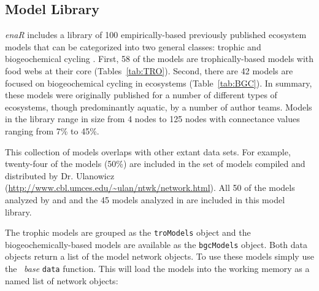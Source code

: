 \documentclass[article]{jss}
\newcommand{\R}{\proglang{R}}
\begin{document}
\subsection{Model Library}

\textit{enaR} includes a library of 100 empirically-based previously
published ecosystem models that can be categorized into two general
classes: trophic and biogeochemical cycling \citep{christian96,
  baird08_sylt, borrett10_idd, borrett15_bgc}.  First, 58 of the
models are trophically-based models with food webs at their core
(Tables~\ref{tab:TRO}).  Second, there are 42 models are focused on
biogeochemical cycling in ecosystems (Table~\ref{tab:BGC}).  In
summary, these models were originally published for a number of
different types of ecosystems, though predominantly aquatic, by a
number of author teams.  Models in the library range in size from 4
nodes to 125 nodes with connectance values ranging from 7\% to 45\%.

This collection of models overlaps with other extant data sets.  For
example, twenty-four of the models (50\%) are included in the set of
models compiled and distributed by Dr. Ulanowicz
(\url{http://www.cbl.umces.edu/~ulan/ntwk/network.html}).  All 50 of
the models analyzed by \citet{borrett10_hmg} and \citet{salas11_did}
and the 45 models analyzed in \citet{borrett13} are included in this
model library.

The trophic models are grouped as the \texttt{troModels} object and
the biogeochemically-based models are available as the
\texttt{bgcModels} object.  Both data objects return a list of the
model network objects.  To use these models simply use the \R\
\textit{base} \texttt{data} function. This will load the models into
the working memory as a named list of network objects:
\end{document}
